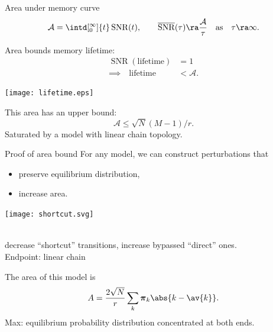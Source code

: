 \documentclass[final]{beamer}%
\DeclareMathOperator{\SNR}{SNR}
\DeclareMathOperator{\snr}{SNR}
\newcommand{\snrb}{\overline{\snr}}
\newcommand{\eq}{\boldsymbol{\pi}}
\newcommand{\area}{\mathcal{A}}
\begin{document}
\begin{frame}{Area under memory curve}
%
  \begin{equation*}
    \area = \intd[_0^\infty]{t} \snr(t),
    \qquad
    \snrb(\tau) \ra \frac{\area}{\tau}
    \quad \text{as} \quad \tau \ra \infty.
  \end{equation*}
%


  \vp\parbox{5cm}{
  Area bounds memory lifetime:\\
  \begin{equation*}
  \begin{aligned}
    \SNR(\text{lifetime})&=1
    \\
    \implies
    \quad
    \text{lifetime} &< \area.
  \end{aligned}
  \end{equation*}
  }
  \parbox{6.5cm}{
    \texttt{[image: lifetime.eps]}
  }

  \vp This area has an upper bound:
  \begin{equation*}
    \area \leq \sqrt{N}(M-1)/r.
  \end{equation*}
  Saturated by a model with linear chain topology.
%
\end{frame}


\begin{frame}[label=fr_areaproof]{Proof of area bound}
%
 For any model, we can construct perturbations that
 \parbox[c]{5cm}{
  \begin{itemize}
    \item preserve equilibrium distribution,
    \item increase area.
  \end{itemize}
  \hyperlink{fr_tech}{}
 }
 \parbox[c]{5cm}{
  \begin{center}
    \texttt{[image: shortcut.svg]}
  \end{center}
 }\\
 \eg decrease ``shortcut'' transitions, increase bypassed ``direct'' ones.\\
 Endpoint: linear chain

 \vp The area of this model is
 \begin{equation*}
   A = \frac{2\sqrt{N}}{r}\sum_k \eq_k \abs{k-\av{k}}.
 \end{equation*}
 \note[item]{max given $\eq$}
 \note[item]{now max \wrt $\eq$}
 Max: equilibrium probability distribution concentrated at both ends.
 \\
%
\end{frame}
\end{document}
